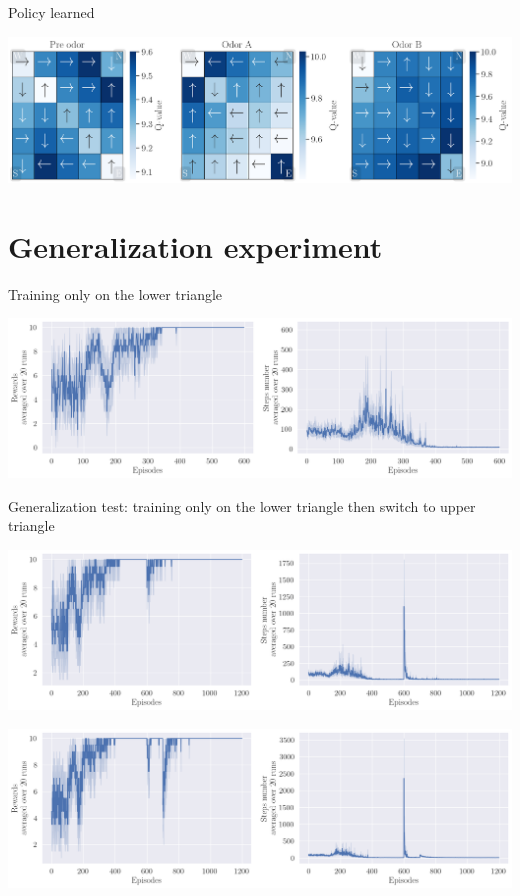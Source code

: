 \documentclass[bigger]{beamer}
\begin{document}
\begin{frame}[label={sec:org94fa2b4}]{Policy learned}
\begin{center}
\includegraphics[width=\linewidth]{img/policy.png}
\end{center}
\end{frame}
\section{Generalization experiment}
\label{sec:orga723019}
\begin{frame}[label={sec:org237acba}]{Training only on the lower triangle}
\begin{center}
\includegraphics[width=\linewidth]{img/steps-and-rewards-lower-only.png}
\end{center}
\end{frame}
\begin{frame}[label={sec:org07aaa32}]{Generalization test: training only on the lower triangle then switch to upper triangle}
\begin{center}
\includegraphics[width=.9\linewidth]{img/steps-and-rewards_upper-then-lower1.png}
\end{center}
\begin{center}
\includegraphics[width=.9\linewidth]{img/steps-and-rewards_upper-then-lower2.png}
\end{center}
\end{frame}
\end{document}
